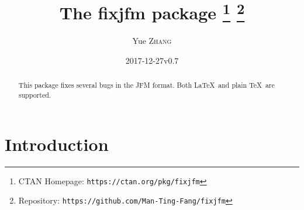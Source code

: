 \documentclass[a4paper]{article}
\newcommand\NormalSans{\normalfont\sffamily}
\newcommand\pkg[1]{{\protect\NormalSans#1}}
\begin{document}
\title{The \pkg{fixjfm} package%
  \thanks{CTAN Homepage: \texttt{https://ctan.org/pkg/fixjfm}}
  \thanks{Repository: \texttt{https://github.com/Man-Ting-Fang/fixjfm}}}
\author{Yue \textsc{Zhang}}
\date{2017-12-27\quad v0.7}

\maketitle

\begin{abstract}
This package fixes several bugs in the JFM format. Both \LaTeX\ and plain \TeX\
are supported.
\end{abstract}

\section{Introduction}
\end{document}
